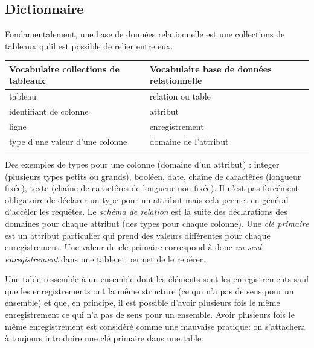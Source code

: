 \subsection{Dictionnaire}
Fondamentalement, une base de données relationnelle est une collections de tableaux qu'il est possible de relier entre eux.
\begin{center}
\begin{tabular}{l|l}
Vocabulaire collections de tableaux & Vocabulaire base de données relationnelle \\ \hline
 tableau & relation ou table \\
 identifiant de colonne & attribut \\
 ligne & enregistrement \\
 type d'une valeur d'une colonne & domaine de l'attribut
\end{tabular}
\end{center}
Des exemples de types pour une colonne (domaine d'un attribut) : integer (plusieurs types petits ou grands), booléen, date, chaîne de caractêres (longueur fixée), texte (chaîne de caractêres de longueur non fixée).
Il n'est pas forcément obligatoire de déclarer un type pour un attribut mais cela permet en général d'accéler les requêtes.\newline
{} Le \emph{schéma de relation} est la suite des déclarations des domaines pour chaque attribut (des types pour chaque colonne).\newline
{}Une \emph{clé primaire} est un attribut particulier qui prend des valeurs différentes pour chaque enregistrement. Une valeur de clé primaire correspond à donc \emph{un seul enregistrement} dans une table et permet de le repérer.

Une table ressemble à un ensemble dont les éléments sont les enregistrements sauf que les enregistrements ont la même structure (ce qui n'a pas de sens pour un ensemble) et que, en principe, il est possible d'avoir plusieurs fois le même enregistrement ce qui n'a pas de sens pour un ensemble. Avoir plusieurs fois le même enregistrement est considéré comme une mauvaise pratique: on s'attachera à toujours introduire une clé primaire dans une table.

